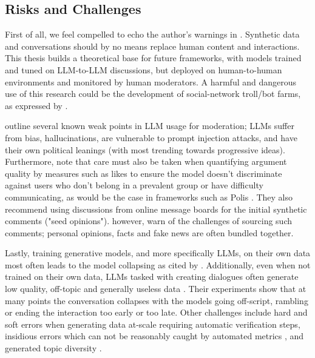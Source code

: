 \subsection{Risks and Challenges}
\label{sec:related:challenges}

First of all, we feel compelled to echo the author's warnings in \cite{small-polis-llm}. Synthetic data and conversations should by no means replace human content and interactions. This thesis builds a theoretical base for future frameworks, with models trained and tuned on LLM-to-LLM discussions, but deployed on human-to-human environments and monitored by human moderators. A harmful and dangerous use of this research could be the development of social-network troll/bot farms, as expressed by \citet{park2022socialsimulacracreatingpopulated}.

\citet{small-polis-llm} outline several known weak points in LLM usage for moderation; LLMs suffer from bias, hallucinations, are vulnerable to prompt injection attacks, and have their own political leanings (with most trending towards progressive ideas). Furthermore, \citet{vecchi-2021-towards} note that care must also be taken when quantifying argument quality by measures such as likes to ensure the model doesn't discriminate against users who don't belong in a prevalent group or have difficulty communicating, as would be the case in frameworks such as Polis \cite{small2021polis}. They also recommend using discussions from online message boards for the initial synthetic comments ("seed opinions"). \citet{vecchi-2021-towards} however, warn of the challenges of sourcing such comments; personal opinions, facts and fake news are often bundled together.

Lastly, training generative models, and more specifically LLMs, on their own data most often leads to the model collapsing \cite{alemohammad2023selfconsuminggenerativemodelsmad, shumailov2024curserecursiontraininggenerated} as cited by \citet{ulmer2024bootstrappingllmbasedtaskorienteddialogue}. Additionally, even when not trained on their own data, LLMs tasked with creating dialogues often generate low quality, off-topic and generally useless data \cite{ulmer2024bootstrappingllmbasedtaskorienteddialogue}. Their experiments show that at many points the conversation collapses with the models going off-script, rambling or ending the interaction too early or too late. Other challenges include hard and soft errors when generating data at-scale \cite{lambert2024selfdirectedsyntheticdialoguesrevisions, ulmer2024bootstrappingllmbasedtaskorienteddialogue} requiring automatic verification steps, insidious errors which can not be reasonably caught by automated metrics \cite{lambert2024selfdirectedsyntheticdialoguesrevisions, ulmer2024bootstrappingllmbasedtaskorienteddialogue}, and generated topic diversity \cite{lambert2024selfdirectedsyntheticdialoguesrevisions}.


